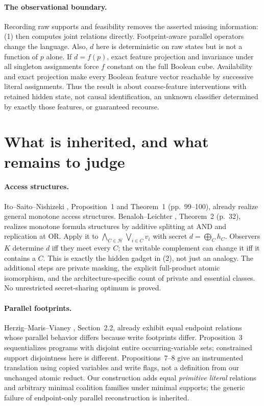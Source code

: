 \documentclass[11pt]{article}
\newcommand{\Hh}{\mathcal H}
\begin{document}
\paragraph{The observational boundary.}
Recording raw supports and feasibility removes the asserted missing information: (1) then computes joint relations directly. Footprint-aware parallel operators change the language. Also, $d$ here is deterministic on raw states but is not a function of $p$ alone. If $d=f(p)$, exact feature projection and invariance under all singleton assignments force $f$ constant on the full Boolean cube. Availability and exact projection make every Boolean feature vector reachable by successive literal assignments. Thus the result is about coarse-feature interventions with retained hidden state, not causal identification, an unknown classifier determined by exactly those features, or guaranteed recourse.

\section{What is inherited, and what remains to judge}
\paragraph{Access structures.}
Ito--Saito--Nishizeki \cite{isn}, Proposition~1 and Theorem~1 (pp.~99--100), already realize general monotone access structures. Benaloh--Leichter \cite{bl}, Theorem~2 (p.~32), realizes monotone formula structures by additive splitting at AND and replication at OR. Apply it to
$\bigwedge_{C\in\Hh}\bigvee_{i\in C}v_i$ with secret $d=\bigoplus_Ch_C$. Observers $K$ determine $d$ iff they meet every $C$; the writable complement can change it iff it contains a $C$. This is exactly the hidden gadget in (2), not just an analogy. The additional steps are private masking, the explicit full-product atomic isomorphism, and the architecture-specific count of private and essential classes. No unrestricted secret-sharing optimum is proved.

\paragraph{Parallel footprints.}
Herzig--Maris--Vianey \cite{dlppa}, Section~2.2, already exhibit equal endpoint relations whose parallel behavior differs because write footprints differ. Proposition~3 sequentializes programs with disjoint entire occurring-variable sets; constrained support disjointness here is different. Propositions~7--8 give an instrumented translation using copied variables and write flags, not a definition from our unchanged atomic reduct. Our construction adds equal \emph{primitive literal} relations and arbitrary minimal coalition families under minimal supports; the generic failure of endpoint-only parallel reconstruction is inherited.
\end{document}
